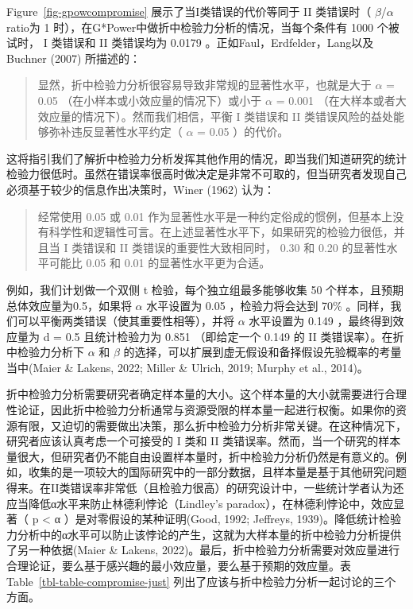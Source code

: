 \documentclass[
  letterpaper,
  DIV=11,
  numbers=noendperiod]{scrreprt}
\begin{document}
Figure~\ref{fig-gpowcompromise} 展示了当I类错误的代价等同于 II
类错误时（ \(\beta\)/\(\alpha\) ratio为 1
时），在G*Power中做折中检验力分析的情况，当每个条件有 1000 个被试时， I
类错误和 II 类错误均为 0.0179 。正如Faul，Erdfelder，Lang以及Buchner
(2007) 所描述的：

\begin{quote}
显然，折中检验力分析很容易导致非常规的显著性水平，也就是大于 \(\alpha\)
= 0.05 （在小样本或小效应量的情况下）或小于 \(\alpha\) = 0.001
（在大样本或者大效应量的情况下）。然而我们相信，平衡 I 类错误和 II
类错误风险的益处能够弥补违反显著性水平约定（ \(\alpha\) = 0.05
）的代价。
\end{quote}

这将指引我们了解折中检验力分析发挥其他作用的情况，即当我们知道研究的统计检验力很低时。虽然在错误率很高时做决定是非常不可取的，但当研究者发现自己必须基于较少的信息作出决策时，Winer
(1962) 认为：

\begin{quote}
经常使用 0.05 或 0.01
作为显著性水平是一种约定俗成的惯例，但基本上没有科学性和逻辑性可言。在上述显著性水平下，如果研究的检验力很低，并且当
I 类错误和 II 类错误的重要性大致相同时， 0.30 和 0.20 的显著性水平可能比
0.05 和 0.01 的显著性水平更为合适。
\end{quote}

例如，我们计划做一个双侧 t 检验，每个独立组最多能够收集 50
个样本，且预期总体效应量为0.5，如果将 \(\alpha\) 水平设置为 0.05
，检验力将会达到 70\%
。同样，我们可以平衡两类错误（使其重要性相等），并将 \(\alpha\)
水平设置为 0.149 ，最终得到效应量为 d = 0.5 且统计检验力为 0.851
（即给定一个 0.149 的 II 类错误率）。在折中检验力分析下 \(\alpha\) 和
\(\beta\) 的选择，可以扩展到虚无假设和备择假设先验概率的考量当中(Maier
\& Lakens, 2022; Miller \& Ulrich, 2019; Murphy et al., 2014)。

折中检验力分析需要研究者确定样本量的大小。这个样本量的大小就需要进行合理性论证，因此折中检验力分析通常与资源受限的样本量一起进行权衡。如果你的资源有限，又迫切的需要做出决策，那么折中检验力分析非常关键。在这种情况下，研究者应该认真考虑一个可接受的
I 类和 II
类错误率。然而，当一个研究的样本量很大，但研究者仍不能自由设置样本量时，折中检验力分析仍然是有意义的。例如，收集的是一项较大的国际研究中的一部分数据，且样本量是基于其他研究问题得来。在II类错误率非常低（且检验力很高）的研究设计中，一些统计学者认为还应当降低α水平来防止林德利悖论（Lindley's
paradox），在林德利悖论中，效应显著（ p \textless{} α
）是对零假设的某种证明(Good, 1992; Jeffreys,
1939)。降低统计检验力分析中的α水平可以防止该悖论的产生，这就为大样本量的折中检验力分析提供了另一种依据(Maier
\& Lakens,
2022)。最后，折中检验力分析需要对效应量进行合理论证，要么基于感兴趣的最小效应量，要么基于预期的效应量。表
Table~\ref{tbl-table-compromise-just}
列出了应该与折中检验力分析一起讨论的三个方面。
\end{document}
